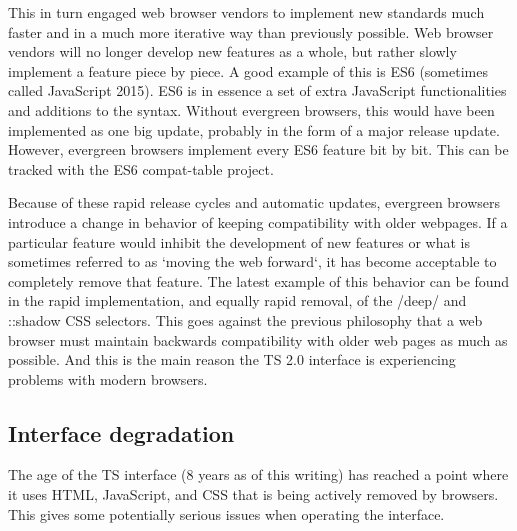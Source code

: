 This in turn engaged web browser vendors to implement new standards much faster
and in a much more iterative way than previously possible.
Web browser vendors will no longer develop new features as a whole, but rather
slowly implement a feature piece by piece.
A good example of this is ES6 (sometimes called JavaScript 2015). ES6 is in
essence a set of extra JavaScript functionalities and additions to the syntax.
Without evergreen browsers, this would have been implemented as one big update,
probably in the form of a major release update.
However, evergreen browsers implement every ES6 feature bit by bit. This can be
tracked with the ES6 compat-table project\cite{compattableproject}.

Because of these rapid release cycles and automatic updates, evergreen browsers
introduce a change in behavior of keeping compatibility with older webpages.
If a particular feature would inhibit the development of new features or what is
sometimes referred to as `moving the web forward`, it has become acceptable to
completely remove that feature.
The latest example of this behavior can be found in the rapid implementation,
and equally rapid removal, of the /deep/ and ::shadow CSS selectors\cite{deepAndShadowCSS}.
This goes against the previous philosophy that a web browser must maintain
backwards compatibility with older web pages as much as possible. And this is
the main reason the TS 2.0 interface is experiencing problems with modern browsers.

\subsection{Interface degradation}
\label{Interface degradation}
The age of the TS interface (8 years as of this writing) has reached a point where it
uses HTML, JavaScript, and CSS that is being actively removed by browsers.
This gives some potentially serious issues when operating the interface.

